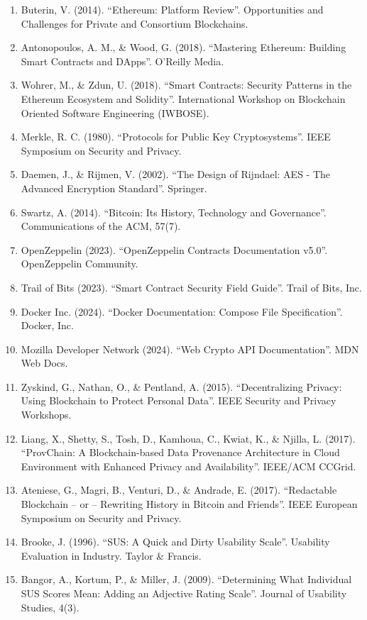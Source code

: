 \documentclass[11pt, a4paper]{article}
\begin{document}
\begin{enumerate}
    \item Buterin, V. (2014). ``Ethereum: Platform Review''. Opportunities and Challenges for Private and Consortium Blockchains.
    \item Antonopoulos, A. M., \& Wood, G. (2018). ``Mastering Ethereum: Building Smart Contracts and DApps''. O'Reilly Media.
    \item Wohrer, M., \& Zdun, U. (2018). ``Smart Contracts: Security Patterns in the Ethereum Ecosystem and Solidity''. International Workshop on Blockchain Oriented Software Engineering (IWBOSE).
    \item Merkle, R. C. (1980). ``Protocols for Public Key Cryptosystems''. IEEE Symposium on Security and Privacy.
    \item Daemen, J., \& Rijmen, V. (2002). ``The Design of Rijndael: AES - The Advanced Encryption Standard''. Springer.
    \item Swartz, A. (2014). ``Bitcoin: Its History, Technology and Governance''. Communications of the ACM, 57(7).
    \item OpenZeppelin (2023). ``OpenZeppelin Contracts Documentation v5.0''. OpenZeppelin Community.
    \item Trail of Bits (2023). ``Smart Contract Security Field Guide''. Trail of Bits, Inc.
    \item Docker Inc. (2024). ``Docker Documentation: Compose File Specification''. Docker, Inc.
    \item Mozilla Developer Network (2024). ``Web Crypto API Documentation''. MDN Web Docs.
    \item Zyskind, G., Nathan, O., \& Pentland, A. (2015). ``Decentralizing Privacy: Using Blockchain to Protect Personal Data''. IEEE Security and Privacy Workshops.
    \item Liang, X., Shetty, S., Tosh, D., Kamhoua, C., Kwiat, K., \& Njilla, L. (2017). ``ProvChain: A Blockchain-based Data Provenance Architecture in Cloud Environment with Enhanced Privacy and Availability''. IEEE/ACM CCGrid.
    \item Ateniese, G., Magri, B., Venturi, D., \& Andrade, E. (2017). ``Redactable Blockchain -- or -- Rewriting History in Bitcoin and Friends''. IEEE European Symposium on Security and Privacy.
    \item Brooke, J. (1996). ``SUS: A Quick and Dirty Usability Scale''. Usability Evaluation in Industry. Taylor \& Francis.
    \item Bangor, A., Kortum, P., \& Miller, J. (2009). ``Determining What Individual SUS Scores Mean: Adding an Adjective Rating Scale''. Journal of Usability Studies, 4(3).
    \end{enumerate}
\end{document}
